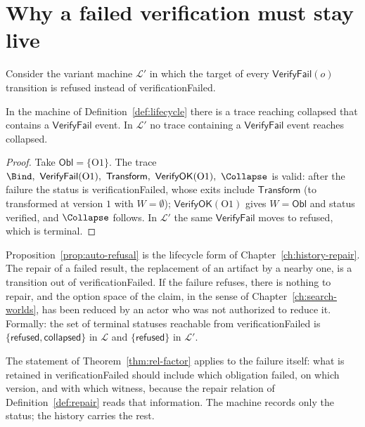 \section{Why a failed verification must stay live}

Consider the variant machine $\mathcal L'$ in which the target of every $\mathsf{VerifyFail}(o)$ transition is \textsf{refused} instead of \textsf{verificationFailed}.

\begin{proposition}
\label{prop:auto-refusal}
In the machine of Definition~\ref{def:lifecycle} there is a trace reaching \textsf{collapsed} that contains a $\mathsf{VerifyFail}$ event. In $\mathcal L'$ no trace containing a $\mathsf{VerifyFail}$ event reaches \textsf{collapsed}.
\end{proposition}

\begin{proof}
Take $\mathsf{Obl}=\{\mathrm O1\}$. The trace $\Bind,\ \mathsf{VerifyFail}(\mathrm O1),\ \mathsf{Transform},\ \mathsf{VerifyOK}(\mathrm O1),\ \Collapse$ is valid: after the failure the status is \textsf{verificationFailed}, whose exits include $\mathsf{Transform}$ (to \textsf{transformed} at version $1$ with $W=\emptyset$); $\mathsf{VerifyOK}(\mathrm O1)$ gives $W=\mathsf{Obl}$ and status \textsf{verified}, and $\Collapse$ follows. In $\mathcal L'$ the same $\mathsf{VerifyFail}$ moves to \textsf{refused}, which is terminal.
\end{proof}

Proposition~\ref{prop:auto-refusal} is the lifecycle form of Chapter~\ref{ch:history-repair}. The repair of a failed result, the replacement of an artifact by a nearby one, is a transition out of \textsf{verificationFailed}. If the failure refuses, there is nothing to repair, and the option space of the claim, in the sense of Chapter~\ref{ch:search-worlds}, has been reduced by an actor who was not authorized to reduce it. Formally: the set of terminal statuses reachable from \textsf{verificationFailed} is $\{\textsf{refused},\textsf{collapsed}\}$ in $\mathcal L$ and $\{\textsf{refused}\}$ in $\mathcal L'$.

\begin{remark}
The statement of Theorem~\ref{thm:rel-factor} applies to the failure itself: what is retained in \textsf{verificationFailed} should include which obligation failed, on which version, and with which witness, because the repair relation of Definition~\ref{def:repair} reads that information. The machine records only the status; the history carries the rest.
\end{remark}

